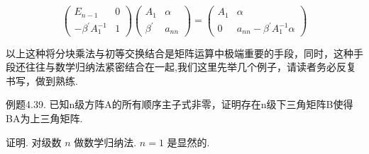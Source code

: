 \documentclass{article}
\begin{document}
\begin{equation*}
    \left(\begin{array}{cc}
        E_{n-1}                    & 0 \\
        -\beta^{\prime} A_{1}^{-1} & 1
    \end{array}\right)\left(\begin{array}{cc}
        A_{1}          & \alpha  \\
        \beta^{\prime} & a_{n n}
    \end{array}\right)=\left(\begin{array}{cc}
        A_{1} & \alpha                                   \\
        0     & a_{n n}-\beta^{\prime} A_{1}^{-1} \alpha
    \end{array}\right)
\end{equation*}

以上这种将分块乘法与初等交换结合是矩阵运算中{\heiti 极端重要}的手段，同时，这种手段还往往与数学归纳法紧密结合在一起,我们这里先举几个例子，请读者{\heiti 务必反复书写}，做到{\heiti 熟练}.

\vspace{1ex}
{\heiti 例题4.39.} {\kaishu 已知n级方阵A的所有顺序主子式非零，证明存在n级下三角矩阵B使得BA为上三角矩阵.}

{\heiti 证明.} 对级数 $n$ 做数学归纳法. $n=1$ 是显然的.
\end{document}
